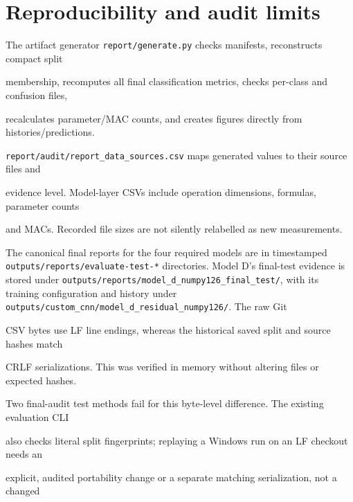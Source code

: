 \documentclass[11pt,a4paper]{article}
\DeclareRobustCommand{\code}[1]{\nolinkurl{#1}}
\begin{document}
\begin{table}[H]\centering\small\caption{MobileNetV2.}\end{table}

\begin{table}[H]\centering\small\caption{ShuffleNetV2 x0.5.}\end{table}



\section{Reproducibility and audit limits}\label{sec:repro}

The artifact generator \code{report/generate.py} checks manifests, reconstructs compact split

membership, recomputes all final classification metrics, checks per-class and confusion files,

recalculates parameter/MAC counts, and creates figures directly from histories/predictions.

\code{report/audit/report_data_sources.csv} maps generated values to their source files and

evidence level. Model-layer CSVs include operation dimensions, formulas, parameter counts

and MACs. Recorded file sizes are not silently relabelled as new measurements.



The canonical final reports for the four required models are in timestamped
\code{outputs/reports/evaluate-test-*} directories. Model D's final-test evidence is stored
under \code{outputs/reports/model_d_numpy126_final_test/}, with its training configuration
and history under \code{outputs/custom_cnn/model_d_residual_numpy126/}. The raw Git

CSV bytes use LF line endings, whereas the historical saved split and source hashes match

CRLF serializations. This was verified in memory without altering files or expected hashes.

Two final-audit test methods fail for this byte-level difference. The existing evaluation CLI

also checks literal split fingerprints; replaying a Windows run on an LF checkout needs an

explicit, audited portability change or a separate matching serialization, not a changed
\end{document}
